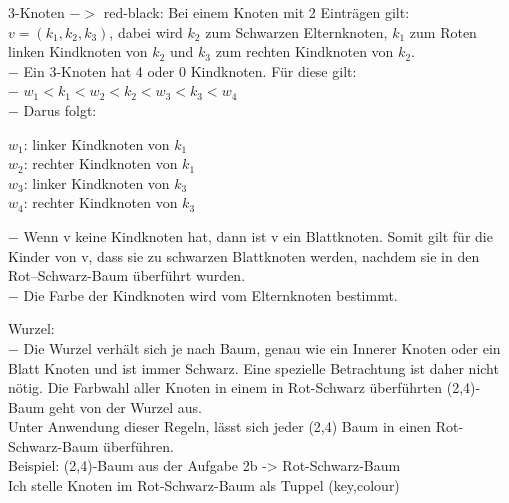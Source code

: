 \begin{addmargin}[1em]{1em}
3-Knoten $->$ red-black: Bei einem Knoten mit 2 Einträgen gilt: $v = (k_1,k_2,k_3)$, dabei wird $k_2$ zum Schwarzen Elternknoten, $k_1$ zum Roten linken Kindknoten von $k_2$ und $k_3$ zum rechten Kindknoten von $k_2$.\\
$-$ Ein 3-Knoten hat 4 oder 0 Kindknoten. Für diese gilt:\\
$-$ $w_1 < k_1 < w_2 < k_2 < w_3 < k_3 < w_4 $\\
$-$ Darus folgt:\\
\end{addmargin}
\begin{addmargin}[2em]{1em}
$w_1$: linker Kindknoten von $k_1$\\
$w_2$: rechter Kindknoten von $k_1$\\
$w_3$: linker Kindknoten von $k_3$\\
$w_4$: rechter Kindknoten von $k_3$\\
\end{addmargin}
\begin{addmargin}[1em]{1em}
$-$ Wenn v keine Kindknoten hat, dann ist v ein Blattknoten. Somit gilt für die Kinder von v, dass sie zu schwarzen Blattknoten werden, nachdem sie in den Rot--Schwarz-Baum überführt wurden.\\
$-$ Die Farbe der Kindknoten wird vom Elternknoten bestimmt.\\
\end{addmargin}

\noindent
Wurzel:\\
$-$ Die Wurzel verhält sich je nach Baum, genau wie ein Innerer Knoten oder ein Blatt Knoten und ist immer Schwarz. Eine spezielle Betrachtung ist daher nicht nötig. Die Farbwahl aller Knoten in einem in Rot-Schwarz überführten (2,4)-Baum geht von der Wurzel aus.\\

\noindent
Unter Anwendung dieser Regeln, lässt sich jeder (2,4) Baum in einen Rot-Schwarz-Baum überführen.\\
Beispiel: (2,4)-Baum aus der Aufgabe 2b -> Rot-Schwarz-Baum\\
Ich stelle Knoten im Rot-Schwarz-Baum als Tuppel (key,colour)\\

